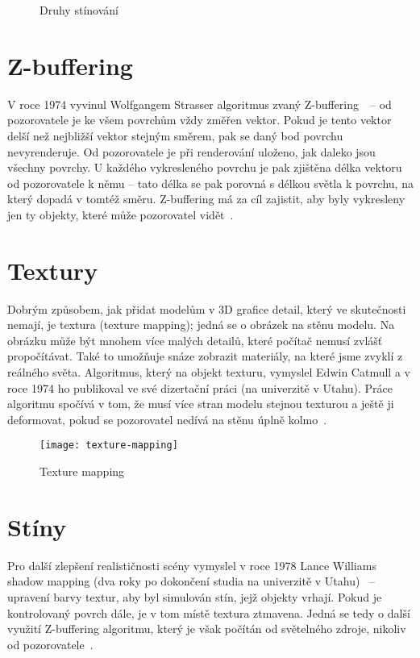 \documentclass[a4paper, 11pt]{report}
\begin{document}
\begin{chapterwithoutpagebreak}
\begin{figure}[h]
    \centering
    \qquad
    \caption[Druhy stínování]{Druhy stínování~\cite{pic:gouraudphong}}
\end{figure}

\section{\label{z-buffering}Z-buffering}
V roce 1974  vyvinul Wolfgangem Strasser algoritmus zvaný \mbox{Z-buffering~\cite{ieee:strasser}}~-- od pozorovatele je ke všem povrchům vždy změřen vektor. Pokud je tento vektor delší než nejbližší vektor stejným směrem, pak se daný bod povrchu nevyrenderuje. Od pozorovatele je při renderování uloženo, jak daleko jsou všechny povrchy. U každého vykresleného povrchu je pak zjištěna délka vektoru od pozorovatele k němu -- tato délka se pak porovná s délkou světla k povrchu, na který dopadá v tomtéž směru. Z-buffering má za cíl zajistit, aby byly vykresleny jen ty objekty, které může pozorovatel vidět~\cite{comphope:z-buffering}.

\section{Textury}
Dobrým způsobem, jak přidat modelům v 3D grafice detail, který ve skutečnosti nemají, je textura (texture mapping); jedná se o obrázek  na stěnu modelu. Na obrázku může být mnohem více malých detailů, které počítač nemusí zvlášť propočítávat. Také to umožňuje snáze zobrazit materiály, na které jsme zvyklí z reálného světa. Algoritmus, který na objekt  texturu, vymyslel Edwin Catmull a v roce 1974 ho publikoval ve své dizertační práci (na univerzitě v Utahu). Práce algoritmu spočívá v tom, že musí více stran modelu  stejnou texturou a ještě ji deformovat, pokud se pozorovatel nedívá na stěnu úplně kolmo~\cite{utexas:texture-mapping}.

\begin{figure}[h]
    \centering
    \texttt{[image: texture-mapping]}
    \caption[Texture mapping]{Texture mapping~\cite{utexas:texture-mapping}}
\end{figure}

\section{Stíny}
Pro další zlepšení realističnosti scény vymyslel v roce 1978 Lance Williams shadow mapping (dva roky po dokončení studia na univerzitě v Utahu)~\cite{nvidia:shadow-mapping} -- upravení barvy textur, aby byl simulován stín, jejž objekty vrhají.  Pokud je kontrolovaný povrch dále, je v tom místě textura ztmavena. Jedná se tedy o další využití Z-buffering algoritmu, který je však počítán od světelného zdroje, nikoliv od pozorovatele~\cite{wiki:shadow-mapping}.


\end{chapterwithoutpagebreak}
\end{document}
